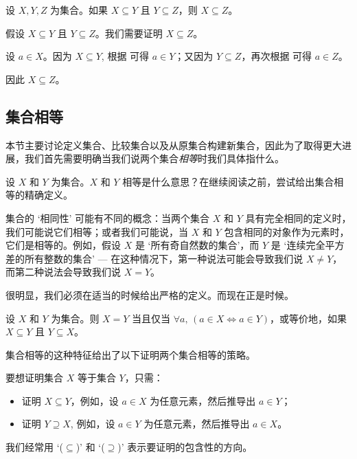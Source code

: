 \begin{proposition}
\label{propSubsetTransitive}
设 $X,Y,Z$ 为集合。如果 $X \subseteq Y$ 且 $Y \subseteq Z$，则 $X \subseteq Z$。
\end{proposition}

\begin{cproof}
假设 $X \subseteq Y$ 且 $Y \subseteq Z$。我们需要证明 $X \subseteq Z$。

设 $a \in X$。因为 $X \subseteq Y$, 根据  可得 $a \in Y$；又因为 $Y \subseteq Z$，再次根据  可得 $a \in Z$。

因此 $X \subseteq Z$。
\end{cproof}

\subsection*{集合相等}

本节主要讨论定义集合、比较集合以及从原集合构建新集合，因此为了取得更大进展，我们首先需要明确当我们说两个集合\textit{相等}时我们具体指什么。

\begin{discussion}
\label{dscSetEquality}
设 $X$ 和 $Y$ 为集合。$X$ 和 $Y$ 相等是什么意思？在继续阅读之前，尝试给出集合相等的精确定义。
\end{discussion}

集合的 `相同性' 可能有不同的概念：当两个集合 $X$ 和 $Y$ 具有完全相同的定义时，我们可能说它们相等；或者我们可能说，当 $X$ 和 $Y$ 包含相同的对象作为元素时，它们是相等的。例如，假设 $X$ 是 `所有奇自然数的集合'，而 $Y$ 是 `连续完全平方差的所有整数的集合' --- 在这种情况下，第一种说法可能会导致我们说 $X \ne Y$，而第二种说法会导致我们说 $X = Y$。

很明显，我们必须在适当的时候给出严格的定义。而现在正是时候。

\begin{axiom}[集合外延性]
\label{axSetEquality}
设 $X$ 和 $Y$ 为集合。则 $X=Y$ 当且仅当 $\forall a,\, (a \in X \Leftrightarrow a \in Y)$，或等价地，如果 $X \subseteq Y$ 且 $Y \subseteq X$。
\end{axiom}

集合相等的这种特征给出了以下证明两个集合相等的策略。

\begin{strategy}[双重包含证明]
要想证明集合 $X$ 等于集合 $Y$，只需：
\begin{itemize}
\item 证明 $X \subseteq Y$，例如，设 $a \in X$ 为任意元素，然后推导出 $a \in Y$；
\item 证明 $Y \supseteq X$, 例如，设 $a \in Y$ 为任意元素，然后推导出 $a \in X$。
\end{itemize}
我们经常用 `($\subseteq$)' 和 `($\supseteq$)' 表示要证明的包含性的方向。
\end{strategy}

